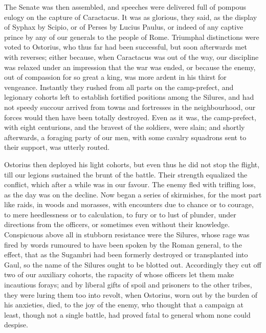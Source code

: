 The Senate was then assembled, and speeches were delivered full of pompous eulogy on the capture of Caractacus. It was as glorious, they said, as the display of Syphax by Scipio, or of Perses by Lucius Paulus, or indeed of any captive prince by any of our generals to the people of Rome. Triumphal distinctions were voted to Ostorius, who thus far had been successful, but soon afterwards met with reverses; either because, when Caractacus was out of the way, our discipline was relaxed under an impression that the war was ended, or because the enemy, out of compassion for so great a king, was more ardent in his thirst for vengeance. Instantly they rushed from all parts on the camp-prefect, and legionary cohorts left to establish fortified positions among the Silures, and had not speedy succour arrived from towns and fortresses in the neighbourhood, our forces would then have been totally destroyed. Even as it was, the camp-prefect, with eight centurions, and the bravest of the soldiers, were slain; and shortly afterwards, a foraging party of our men, with some cavalry squadrons sent to their support, was utterly routed.


Ostorius then deployed his light cohorts, but even thus he did not stop the flight, till our legions sustained the brunt of the battle. Their strength equalized the conflict, which after a while was in our favour. The enemy fled with trifling loss, as the day was on the decline. Now began a series of skirmishes, for the most part like raids, in woods and morasses, with encounters due to chance or to courage, to mere heedlessness or to calculation, to fury or to lust of plunder, under directions from the officers, or sometimes even without their knowledge. Conspicuous above all in stubborn resistance were the Silures, whose rage was fired by words rumoured to have been spoken by the Roman general, to the effect, that as the Sugambri had been formerly destroyed or transplanted into Gaul, so the name of the Silures ought to be blotted out. Accordingly they cut off two of our auxiliary cohorts, the rapacity of whose officers let them make incautious forays; and by liberal gifts of spoil and prisoners to the other tribes, they were luring them too into revolt, when Ostorius, worn out by the burden of his anxieties, died, to the joy of the enemy, who thought that a campaign at least, though not a single battle, had proved fatal to general whom none could despise.


